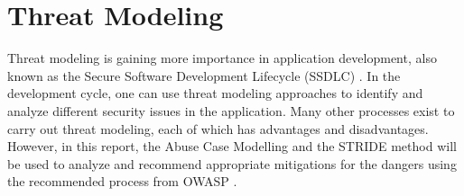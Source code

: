 \chapter{Threat Modeling}
\label{chap:threat_modeling}
Threat modeling is gaining more importance in application development, also known as the Secure Software Development Lifecycle (SSDLC) \citep{snyk_2022}. In the development cycle, one can use threat modeling approaches to identify and analyze different security issues in the application. Many other processes exist to carry out threat modeling, each of which has advantages and disadvantages. However, in this report, the Abuse Case Modelling and the STRIDE method will be used to analyze and recommend appropriate mitigations for the dangers using the recommended process from OWASP \citep{owasp_threat_model_process}.


\begin{comment}
\section{Trust Levels}
The trust levels define the privileges and grants an external entity/actors receive to use the application. The trust levels defined for the ASMIS system for the Queens medical center are defined in Table \ref{table:trust_levels}

\begingroup
\centering
\setlength{\tabcolsep}{6.5pt} %
\renewcommand{\arraystretch}{1.8} %
\begin{longtable}{ |p{1cm}|p{6cm}|p{8cm}|}
 \hline
 \textbf{ID} & \textbf{Name} & \textbf{Description} \\ [0.5ex] 
 \hline
 1 & Anonymous Web User/Patient & A user who can schedule an appointment with a specialist without providing valid credentials. However, Personal Identifiable Information is provided during scheduling. \\
 \hline
 2 & Specialist with Valid Login Credentials & A special user who is a doctor/specialist in the clinic. When logged in using valid credentials, he/she can manage, create, modify, and view scheduling information connected to their profile. \\
 \hline
 3 & Receptionist with Valid Login Credentials & A special user who is a receptionist in the clinic. When logged in using valid credentials, he/she can manage, create, modify, and view the scheduling information of all patients. \\
 \hline
 4 & Admin with Valid Login Credentials & A special user who is an Admin in the clinic. When logged in using valid credentials, he/she can manage, create, modify, and view scheduling information connected to all specialist profiles. Additionally, the admin can add new specialists and assign permissions.\\
 \hline
 5 & Database Read/Write User & A database account is used to read and write the contents of the database.  \\ [1ex]
 \hline
\caption{Trust Levels ASMIS system.}
\label{table:trust_levels}
\end{longtable}
\endgroup
\end{comment}

